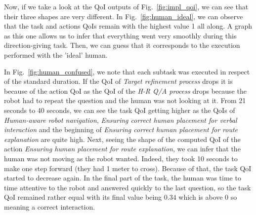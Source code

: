 \documentclass[a4paper,11pt,twoside]{StyleThese}
\begin{document}
Now, if we take a look at the QoI outputs of Fig.~\ref{fig:impl_qoi}, we can see that their three shapes are very different. In Fig.~\ref{fig:human_ideal}, we can observe that the task and actions QoIs remain with the highest value 1 all along. A graph as this one allows us to infer that everything went very smoothly during this direction-giving task. Then, we can guess that it corresponds to the execution performed with the 'ideal' human. 

In Fig.~\ref{fig:human_confused}, we note that each subtask was executed in respect of the standard duration. If the QoI of \emph{Target refinement process} drops it is because of the action QoI as the QoI of the \emph{H-R Q/A process} drops because the robot had to repeat the question and the human was not looking at it. From 21 seconds to 40 seconds, we can see the task QoI getting higher as the QoIs of \emph{Human-aware robot navigation}, \emph{Ensuring correct human placement for verbal interaction} and the beginning of \emph{Ensuring correct human placement for route explanation} are quite high. Next, seeing the shape of the computed QoI of the action \emph{Ensuring human placement for route explanation}, we can infer that the human was not moving as the robot wanted. Indeed, they took 10 seconds to make one step forward (they had 1 meter to cross). Because of that, the task QoI started to decrease again. In the final part of the task, the human was time to time attentive to the robot and answered quickly to the last question, so the task QoI remained rather equal with its final value being $0.34$ which is above 0 so meaning a correct interaction.
\end{document}
